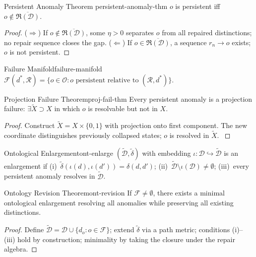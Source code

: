 \documentclass[12pt,twoside,openright]{book}
\newcommand{\repair}{\mathfrak{R}}
\begin{document}
\begin{theorem}{Persistent Anomaly Theorem}%
  {persistent-anomaly-thm}
  $o$ is persistent iff
  $o\notin\overline{\repair(\mathcal{D})}$.
\end{theorem}
\begin{proof}
  ($\Rightarrow$) If $o\notin\overline{\repair(\mathcal{D})}$,
  some $\eta>0$ separates $o$ from all repaired
  distinctions; no repair sequence closes the gap.
  ($\Leftarrow$) If $o\in\overline{\repair(\mathcal{D})}$,
  a sequence $r_n\to o$ exists; $o$ is not persistent.
\end{proof}

\begin{definition}{Failure Manifold}{failure-manifold}
  $\mathcal{F}(d^*,\mathcal{R})=\{o\in\mathcal{O}:
  o\text{ persistent relative to }(\mathcal{R},d^*)\}$.
\end{definition}

\begin{theorem}{Projection Failure Theorem}{proj-fail-thm}
  Every persistent anomaly is a projection failure:
  $\exists\tilde{X}\supset X$ in which $o$ is resolvable
  but not in $X$.
\end{theorem}
\begin{proof}
  Construct $\tilde{X}=X\times\{0,1\}$ with projection
  onto first component. The new coordinate distinguishes
  previously collapsed states; $o$ is resolved in
  $\tilde{X}$. \parencite{kuhn1962structure}
\end{proof}

\begin{definition}{Ontological Enlargement}{ont-enlarge}
  $(\tilde{\mathcal{D}},\tilde\delta)$ with embedding
  $\iota:\mathcal{D}\hookrightarrow\tilde{\mathcal{D}}$ is
  an enlargement if (i)~$\tilde\delta(\iota(d),\iota(d'))
  =\delta(d,d')$; (ii)~$\tilde{\mathcal{D}}\setminus
  \iota(\mathcal{D})\ne\emptyset$;
  (iii)~every persistent anomaly resolves in
  $\tilde{\mathcal{D}}$.
\end{definition}

\begin{theorem}{Ontology Revision Theorem}{ont-revision}
  If $\mathcal{F}\ne\emptyset$, there exists a minimal
  ontological enlargement resolving all anomalies
  while preserving all existing
  distinctions.
\end{theorem}
\begin{proof}
  Define $\tilde{\mathcal{D}}=\mathcal{D}\cup
  \{d_o:o\in\mathcal{F}\}$; extend $\tilde\delta$ via
  a path metric; conditions (i)--(iii) hold by
  construction; minimality by taking the closure under
  the repair algebra.
\end{proof}
\end{document}

